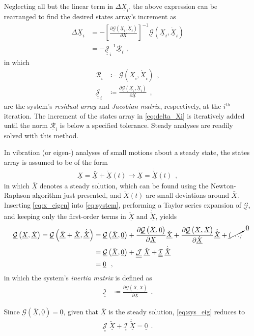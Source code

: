 \documentclass[12pt,a4paper,oneside,english]{abntex2} %
\newcommand{\vect}[1]{\underline{#1}}
\newcommand{\del}[2]{\frac{\partial#1}{\partial#2}}
\def\tens#1{\underline{\underline{#1}}}
\def\lb{\left[}
\def\rb{\right]}
\def\lp{\left(}
\def\rp{\right)}
\def\zv{\vect{0}}
\def\Sys{\mathcal{\vect{G}}}
\def\X{\vect{X}}
\def\Xi{\X_i}
\def\Xdot{\dot{\X}}
\def\Xdoti{\dot{\X}_i}
\def\Xbar{\bar{{\X}}}
\def\Xv{\check{{\X}}}
\def\Xvdot{\dot{\Xv}}
\def\Resi{\vect{\mathcal{R}}_i}
\def\JacSys{\tens{\mathcal{J}}}
\def\JacSysi{\JacSys_i}
\def\MassSys{\tens{\mathcal{I}}}
\begin{document}
Neglecting all but the linear term in $\Delta\Xi$, the above expression can be rearranged to find the desired states array's increment as
\begin{align}
    \Delta\Xi &= -\lb\del{\Sys\lp\Xi,\Xdoti\rp}{\X}\rb^{-1}\Sys\lp\Xi,\Xdoti\rp \nonumber 
    \\
    &= -\JacSysi^{-1}\Resi \ \ ,
    \label{eq:delta_Xi}
\end{align}
in which 
\begin{align}
    \Resi &\coloneqq \Sys\lp\Xi,\Xdoti\rp
    \ \ , \label{eq:Res}
    \\
    \JacSysi &\coloneqq \del{\Sys\lp\Xi,\Xdoti\rp}{\X} \ \ ,
    \label{eq:JacSys}
\end{align}
are the system's \textit{residual array} and \textit{Jacobian matrix}, respectively, at the $i^{\text{th}}$ iteration. The increment of the states array in \cref{eq:delta_Xi} is iteratively added until the norm $\Resi$ is below a specified tolerance. Steady analyses are readily solved with this method.

In vibration (or eigen-) analyses of small motions about a steady state, the states array is assumed to be of the form
\begin{align}
    \X = \Xbar+\Xv(t) \rightarrow \Xdot = \Xvdot(t) \ \ ,
    \label{eq:x_eigen}
\end{align}
in which $\Xbar$ denotes a steady solution, which can be found using the Newton-Raphson algorithm just presented, and $\Xv(t)$ are small deviations around $\Xbar$. Inserting \cref{eq:x_eigen} into \cref{eq:system}, performing a Taylor series expansion of $\Sys$, and keeping only the first-order terms in $\Xv$ and $\Xvdot$,  yields
\begin{align}
    \Sys\lp\X,\Xdot\rp = \Sys\lp\Xbar+\Xv,\Xvdot\rp &= \Sys\lp\Xbar,\zv\rp + \del{\Sys\lp\Xbar,\zv\rp}{\X}\Xv + \del{\Sys\lp\Xbar,\Xdot\rp}{\Xdot}\Xvdot + \cancelto{\zv}{\lp\ldots\rp} \nonumber 
    \\
    &= \Sys\lp\Xbar,\zv\rp + \JacSys\;\Xv + \MassSys\;\Xvdot \nonumber 
    \\
    &= \zv \ \ ,
    \label{eq:sys_eig}
\end{align}
in which the system's \textit{inertia matrix} is defined as
\begin{align}
    \MassSys &\coloneqq \del{\Sys\lp\Xbar,\Xdot\rp}{\Xdot} \ \ .
    \label{eq:MassSys}
\end{align}

Since $\Sys\lp\Xbar,\zv\rp = \zv$, given that $\Xbar$ is the steady solution, \cref{eq:sys_eig} reduces to
\begin{align}
    \JacSys\;\Xv + \MassSys\;\Xvdot = \zv \ \ .
    \label{eq:sys_eig2}
\end{align}
\end{document}
